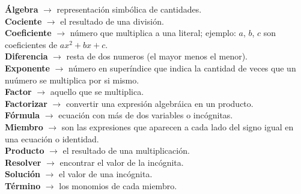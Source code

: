 \begin{defcard}
    \textbf{Álgebra} $\rightarrow$ representación simbólica de cantidades.\\
    \textbf{Cociente} $\rightarrow$ el resultado de una división.\\
    \textbf{Coeficiente} $\rightarrow$ número que multiplica a una literal; ejemplo: $a$, $b$, $c$ son coeficientes de $ax^2+bx+c$.\\
    \textbf{Diferencia} $\rightarrow$ resta de dos numeros (el mayor menos el menor).\\
    \textbf{Exponente} $\rightarrow$ número en superíndice que indica la cantidad de veces que un nuúmero se multiplica por si mismo.\\
    \textbf{Factor} $\rightarrow$ aquello que se multiplica.\\
    \textbf{Factorizar} $\rightarrow$ convertir una expresión algebráica en un producto.\\
    \textbf{Fórmula} $\rightarrow$ ecuación con más de dos variables o incógnitas.\\
    \textbf{Miembro} $\rightarrow$ son las expresiones que aparecen a cada lado del signo igual en una ecuación o identidad.\\
    \textbf{Producto} $\rightarrow$ el resultado de una multiplicación.\\
    \textbf{Resolver} $\rightarrow$ encontrar el valor de la incógnita.\\
    \textbf{Solución} $\rightarrow$ el valor de una incógnita.\\
    \textbf{Término} $\rightarrow$ los monomios de cada miembro.\\
\end{defcard}